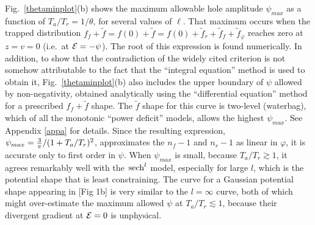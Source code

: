 \documentclass[aip,pop,article-title]{revtex4-2}
\def\energy{{\cal E}}
\def\sech{{\,\rm sech}}
\begin{document}
Fig.\ \ref{thetaminplot}(b) shows the maximum allowable hole amplitude
${\psi}_{max}$ as a function of $T_a/T_r=1/\theta$, for several values
of $\ell$. That maximum occurs when the trapped distribution
$f_f+\tilde f=f(0)+\tilde f=f(0)+\tilde f_r+\tilde f_f+\tilde
f_\varphi$ reaches zero at $z=v=0$ (i.e.\ at $\energy=-{\psi}$). The
root of this expression is found numerically. In addition, to show
that the contradiction of the widely cited criterion is not somehow
attributable to the fact that the ``integral equation'' method is used
to obtain it, Fig.\ \ref{thetaminplot}(b) also includes the upper
boundary of ${\psi}$ allowed by non-negativity, obtained analytically
using the ``differential equation'' method for a prescribed
$f_f+\tilde f$ shape. The $\tilde f$ shape for this curve is two-level
(waterbag), which of all the monotonic ``power deficit''
models\cite{Hutchinson2021a}, allows the highest ${\psi}_{max}$. See
Appendix \ref{appa} for details. Since the resulting expression,
${\psi}_{max}={3\over \pi}/(1+T_a/T_r)^2$, approximates the $n_f-1$
and $n_r-1$ as linear in $\varphi$, it is accurate only to first order
in ${\psi}$. When ${\psi}_{max}$ is small, because $T_a/T_r\gtrsim1$,
it agrees remarkably well with the $\sech^l$ model, especially for
large $l$, which is the potential shape that is least
constraining. The curve for a Gaussian potential shape appearing in
\citet{Chen2004}[Fig 1b] is very similar to the $l=\infty$ curve,
both of which might over-estimate the maximum allowed $\psi$ at
$T_a/T_r\lesssim 1$, because their divergent gradient at $\energy=0$ is
unphysical.
\end{document}
